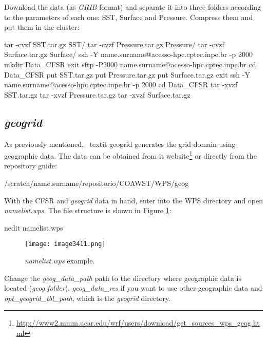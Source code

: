 \noindent Download the data (as \textit{GRIB} format) and separate it into three folders according to the parameters of each one:
SST, Surface and Pressure. Compress them and put them in the cluster:
\bigskip

\begin{bashcode}
tar -cvzf SST.tar.gz SST/
tar -cvzf Pressure.tar.gz Pressure/
tar -cvzf Surface.tar.gz Surface/
ssh -Y name.surname@acesso-hpc.cptec.inpe.br -p 2000
mkdir Data_CFSR
exit
sftp -P2000 name.surname@acesso-hpc.cptec.inpe.br
cd Data_CFSR
put SST.tar.gz
put Pressure.tar.gz
put Surface.tar.gz
exit
ssh -Y name.surname@acesso-hpc.cptec.inpe.br -p 2000
cd Data_CFSR
tar -xvzf SST.tar.gz
tar -xvzf Pressure.tar.gz
tar -xvzf Surface.tar.gz
\end{bashcode}
\bigskip

\subsection{\textit{geogrid}}\label{geowps}
\bigskip

\noindent As previously mentioned, \ textit {geogrid} generates the grid domain using geographic data. The data can be obtained from it 
website\textcolor{bleu_cite}{\textit{}\footnote{\textcolor{bleu_cite}{\href{http://www2.mmm.ucar.edu/wrf/users/download/get\_sources\_wps\_geog.html}{http://www2.mmm.ucar.edu/wrf/users/download/get\_sources\_wps\_geog.html}}}}
 or directly from the repository guide:
\bigskip

\begin{bashcode}
/scratch/name.surname/repositorio/COAWST/WPS/geog
\end{bashcode}
\bigskip

\noindent With the CFSR and \textit{geogrid} data in hand, enter into the WPS directory and open \textit{namelist.wps}. 
The file structure is shown in Figure \textcolor{bleu_cite}{\ref{namelistwps}}:
\bigskip

\begin{bashcode}
nedit namelist.wps
\end{bashcode}
\bigskip

\begin{figure}[H]
    \centering
    \texttt{[image: image3411.png]}
    \caption{\textit{namelist.wps} example.}
    \label{namelistwps}
\end{figure}
\bigskip

\noindent Change the \textit{geog\_data\_path} path to the directory where geographic data is located (\textit{geog folder}), 
\textit{geog\_data\_res} if you want to use other geographic data and \textit{opt\_geogrid\_tbl\_path}, which is the 
\textit{geogrid} directory.

